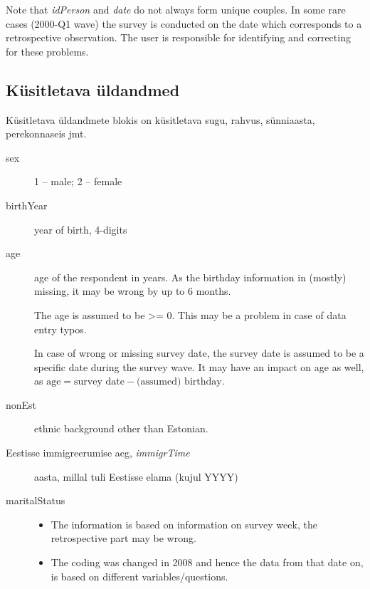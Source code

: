 \documentclass[a4paper]{article}
\begin{document}
Note that \emph{idPerson} and \emph{date} do not always form unique
couples.  In some rare cases (2000-Q1 wave) the survey is conducted on
the date which corresponds to a retrospective observation.  The user
is responsible for identifying and correcting for these problems.

\subsection{Küsitletava üldandmed}
Küsitletava üldandmete blokis on küsitletava sugu, rahvus, sünniaasta,
perekonnaseis jmt.

\begin{description}
\item[sex] 1 -- male; 2 -- female
\item[birthYear] year of birth, 4-digits 
\item[age] age of the respondent in years. As the birthday information
  in (mostly) missing, it may be wrong by up to 6 months.  

  The age is assumed to be >= 0.  This may be a problem in case of
  data entry typos.

  In case of wrong or missing survey date, the survey date is assumed
  to be a specific date during the survey wave.  It may have an impact
  on age as well, as $\text{age} = \text{survey date} -
  \text{(assumed) birthday}$. 

\item[nonEst] ethnic background other than Estonian.  

\item[Eestisse immigreerumise aeg, \textit{immigrTime}] aasta, millal tuli
  Eestisse elama (kujul YYYY)

\item[maritalStatus]
  \begin{itemize}
  \item The information is based on information on survey week, the
    retrospective part may be wrong.
  \item The coding was changed in 2008 and hence the data from that
    date on, is based on different variables/questions.
  \end{itemize}


\end{description}
\end{document}
